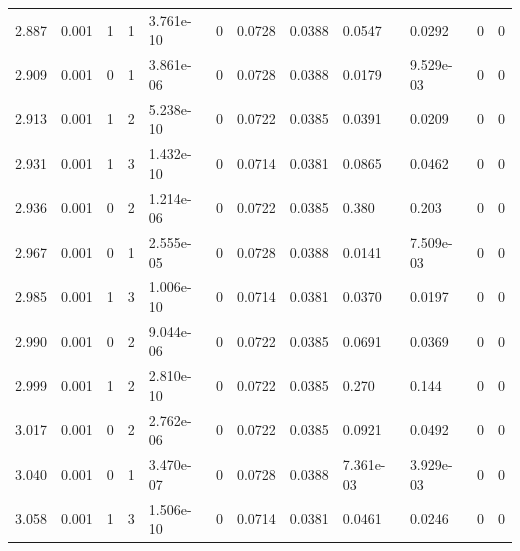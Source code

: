 \documentclass[preview]{standalone}
\begin{document}
{{{{\begin{tabular}{L{1.2cm}C{1.2cm} C{0.3cm}C{0.5cm} C{1.4cm}C{1.4cm} C{1.4cm}C{1.4cm} C{1.6cm}C{1.6cm} C{1.6cm}C{1.6cm}}
  2.887  &  0.001  & 1     &  1 &  3.761e-10  & 0  &  0.0728&   0.0388& 0.0547 & 0.0292   &  0 & 0  \\ 
  2.909  &  0.001  & 0     &  1 &  3.861e-06  & 0  &  0.0728&   0.0388& 0.0179 & 9.529e-03   &  0 & 0  \\ 
  2.913  &  0.001  & 1     &  2 &  5.238e-10  & 0  &  0.0722&   0.0385& 0.0391 & 0.0209   &  0 & 0  \\ 
  2.931  &  0.001  & 1     &  3 &  1.432e-10  & 0  &  0.0714&   0.0381& 0.0865 & 0.0462   &  0 & 0  \\ 
  2.936  &  0.001  & 0     &  2 &  1.214e-06  & 0  &  0.0722&   0.0385& 0.380 & 0.203   &  0 & 0  \\ 
  2.967  &  0.001  & 0     &  1 &  2.555e-05  & 0  &  0.0728&   0.0388& 0.0141 & 7.509e-03   &  0 & 0  \\ 
  2.985  &  0.001  & 1     &  3 &  1.006e-10  & 0  &  0.0714&   0.0381& 0.0370 & 0.0197   &  0 & 0  \\ 
  2.990  &  0.001  & 0     &  2 &  9.044e-06  & 0  &  0.0722&   0.0385& 0.0691 & 0.0369   &  0 & 0  \\ 
  2.999  &  0.001  & 1     &  2 &  2.810e-10  & 0  &  0.0722&   0.0385& 0.270 & 0.144   &  0 & 0  \\ 
  3.017  &  0.001  & 0     &  2 &  2.762e-06  & 0  &  0.0722&   0.0385& 0.0921 & 0.0492   &  0 & 0  \\ 
  3.040  &  0.001  & 0     &  1 &  3.470e-07  & 0  &  0.0728&   0.0388& 7.361e-03 & 3.929e-03   &  0 & 0  \\ 
  3.058  &  0.001  & 1     &  3 &  1.506e-10  & 0  &  0.0714&   0.0381& 0.0461 & 0.0246   &  0 & 0  \\ 
\hline 
\end{tabular} 

}}}}
\end{document}
